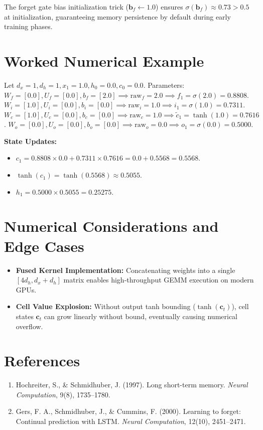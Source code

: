 \documentclass[11pt,a4paper]{article}
\theoremstyle{definition}
\begin{document}
The forget gate bias initialization trick ($\mathbf{b}_f \gets 1.0$) ensures $\sigma(\mathbf{b}_f) \approx 0.73 > 0.5$ at initialization, guaranteeing memory persistence by default during early training phases.

\section{Worked Numerical Example}

Let $d_x = 1, d_h = 1, x_1 = 1.0, h_0 = 0.0, c_0 = 0.0$.
Parameters:
$W_f = [0.0], U_f = [0.0], b_f = [2.0] \implies \text{raw}_f = 2.0 \implies f_1 = \sigma(2.0) = 0.8808$.
$W_i = [1.0], U_i = [0.0], b_i = [0.0] \implies \text{raw}_i = 1.0 \implies i_1 = \sigma(1.0) = 0.7311$.
$W_c = [1.0], U_c = [0.0], b_c = [0.0] \implies \text{raw}_c = 1.0 \implies \tilde{c}_1 = \tanh(1.0) = 0.7616$.
$W_o = [0.0], U_o = [0.0], b_o = [0.0] \implies \text{raw}_o = 0.0 \implies o_1 = \sigma(0.0) = 0.5000$.

\textbf{State Updates:}
\begin{itemize}
    \item $c_1 = 0.8808 \times 0.0 + 0.7311 \times 0.7616 = 0.0 + 0.5568 = 0.5568$.
    \item $\tanh(c_1) = \tanh(0.5568) \approx 0.5055$.
    \item $h_1 = 0.5000 \times 0.5055 = 0.25275$.
\end{itemize}

\section{Numerical Considerations and Edge Cases}

\begin{itemize}
    \item \textbf{Fused Kernel Implementation:} Concatenating weights into a single $[4d_h, d_x + d_h]$ matrix enables high-throughput GEMM execution on modern GPUs.
    \item \textbf{Cell Value Explosion:} Without output tanh bounding ($\tanh(\mathbf{c}_t)$), cell states $\mathbf{c}_t$ can grow linearly without bound, eventually causing numerical overflow.
\end{itemize}

\section{References}
\begin{enumerate}
    \item Hochreiter, S., & Schmidhuber, J. (1997). Long short-term memory. \emph{Neural Computation}, 9(8), 1735--1780.
    \item Gers, F. A., Schmidhuber, J., & Cummins, F. (2000). Learning to forget: Continual prediction with LSTM. \emph{Neural Computation}, 12(10), 2451--2471.
\end{enumerate}
\end{document}
